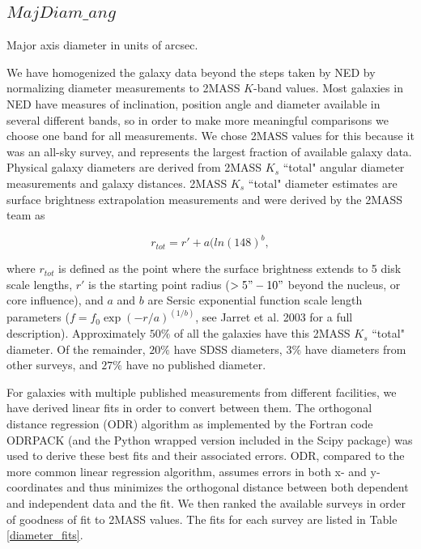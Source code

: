 \documentclass[iop]{emulateapj-rtx4}
\begin{document}
\subsection{$MajDiam\_ang$} \label{diameters}
Major axis diameter in units of arcsec.

We have homogenized the galaxy data beyond the steps taken by NED by normalizing diameter measurements to 2MASS $K$-band values. Most galaxies in NED have measures of inclination, position angle and diameter available in several different bands, so in order to make more meaningful comparisons we choose one band for all measurements. We chose 2MASS values for this because it was an all-sky survey, and represents the largest fraction of available galaxy data. Physical galaxy diameters are derived from 2MASS $K_s$ ``total" angular diameter measurements and galaxy distances. 2MASS $K_s$ ``total" diameter estimates are surface brightness extrapolation measurements and were derived by the 2MASS team as 

\begin{equation}
r_{tot} = r' + a(ln(148)^b,
\end{equation}

\noindent where $r_{tot}$ is defined as the point where the surface brightness extends to 5 disk scale lengths, $r'$ is the starting point radius ($>5" - 10"$ beyond the nucleus, or core influence), and $a$ and $b$ are Sersic exponential function scale length parameters ($f = f_0 \exp{(-r/a)}^{(1/b)}$, see Jarret et al. 2003 for a full description). Approximately $50\%$ of all the galaxies have this 2MASS $K_s$ ``total" diameter. Of the remainder, $20\%$ have SDSS diameters, $3\%$ have diameters from other surveys, and $27\%$ have no published diameter. 

For galaxies with multiple published measurements from different facilities, we have derived linear fits in order to convert between them. The orthogonal distance regression (ODR) algorithm as implemented by the Fortran code ODRPACK (and the Python wrapped version included in the Scipy package) was used to derive these best fits and their associated errors. ODR, compared to the more common linear regression algorithm, assumes errors in both x- and y-coordinates and thus minimizes the orthogonal distance between both dependent and independent data and the fit. We then ranked the available surveys in order of goodness of fit to 2MASS values. The fits for each survey are listed in Table \ref{diameter_fits}. 
\end{document}
